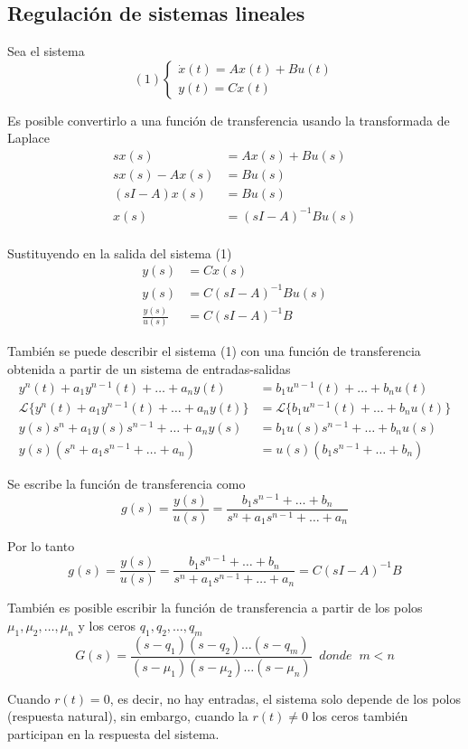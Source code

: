 \subsection{Regulación de sistemas lineales}
Sea el sistema
\[(1)
    \left\{
        \begin{array}{lll}
            \dot{x}(t) = Ax(t) + Bu(t) \\
            y(t) = Cx(t)
        \end{array}
    \right.
\]

Es posible convertirlo a una función de transferencia usando la transformada de Laplace
\[
    \begin{split}
        sx(s) & = Ax(s) + Bu(s) \\
        sx(s) - Ax(s) & = Bu(s) \\
        (sI-A)x(s) & = Bu(s) \\
        x(s) & = (sI-A)^{-1}Bu(s) \\
    \end{split}
\]

Sustituyendo en la salida del sistema (1)
\[
    \begin{split}
        y(s) & = Cx(s) \\
        y(s) & = C(sI-A)^{-1}Bu(s) \\
        \frac{y(s)}{u(s)} & = C(sI-A)^{-1}B
    \end{split}
\]

También se puede describir el sistema (1) con una función de transferencia obtenida a partir de un sistema de entradas-salidas 
\[
    \begin{split}
        y^{n}(t) + a_{1}y^{n-1}(t) + \ldots + a_{n}y(t) & = b_{1}u^{n-1}(t) + \ldots + b_{n}u(t) \\
        \mathcal{L} \{ y^{n}(t) + a_{1}y^{n-1}(t) + \ldots + a_{n}y(t) \} & = \mathcal{L} \{ b_{1}u^{n-1}(t) + \ldots + b_{n}u(t) \} \\
        y(s)s^{n} + a_{1}y(s)s^{n-1} + \ldots + a_{n}y(s) & = b_{1}u(s)s^{n-1} + \ldots + b_{n}u(s) \\
        y(s) (s^{n} + a_{1}s^{n-1} +\ldots + a_{n} ) & = u(s) (b_{1}s^{n-1} + \ldots + b_{n})
    \end{split}
\]

Se escribe la función de transferencia como 
\[
    g(s) = \frac{y(s)}{u(s)} = \frac{ b_{1}s^{n-1} + \ldots + b_{n} }{ s^{n} + a_{1}s^{n-1} +\ldots + a_{n} }
\]

Por lo tanto
\[
    g(s) = \frac{y(s)}{u(s)} = \frac{ b_{1}s^{n-1} + \ldots + b_{n} }{ s^{n} + a_{1}s^{n-1} +\ldots + a_{n} } = C(sI-A)^{-1}B
\]

También es posible escribir la función de transferencia a partir de los polos \( \mu_{1}, \mu_{2}, \ldots, \mu_{n} \) y los ceros \( q_{1}, q_{2}, \ldots, q_{m} \)
\[
    G(s) = \frac{(s-q_{1}) (s-q_{2}) \ldots (s-q_{m})}{(s-\mu_{1}) (s-\mu_{2}) \ldots (s-\mu_{n})} \;\; donde \;\; m < n
\]

Cuando \( r(t) = 0 \), es decir, no hay entradas, el sistema solo depende de los polos (respuesta natural), sin embargo, cuando la \( r(t) \not = 0 \) los ceros también participan en la respuesta del sistema.